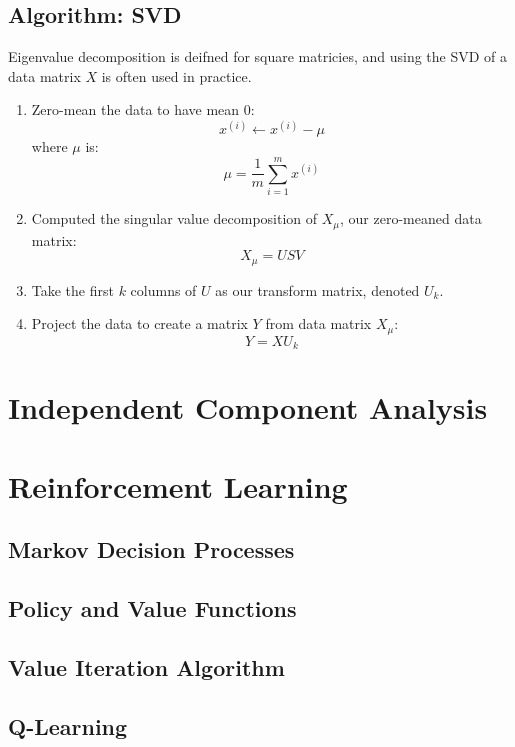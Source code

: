 \documentclass[twoside,twocolumn]{article}
\begin{document}
\subsection{Algorithm: SVD}
Eigenvalue decomposition is deifned for square matricies, and using the SVD of a
data matrix $X$ is often used in practice.
\begin{enumerate}
  \item Zero-mean the data to have mean $0$:
    \begin{equation} x^{(i)}\leftarrow x^{(i)}-\mu \end{equation}
      where $\mu$ is:
      \begin{equation} \mu = \frac{1}{m}\sum_{i=1}^mx^{(i)} \end{equation}
  \item Computed the singular value decomposition of $X_{\mu}$, our zero-meaned
    data matrix:
    \begin{equation}
      X_{\mu} = USV
    \end{equation}
  \item Take the first $k$ columns of $U$ as our transform matrix, denoted $U_k$.
  \item Project the data to create a matrix $Y$ from data matrix $X_{\mu}$:
    \begin{equation} Y = X U_k\end{equation}
\end{enumerate}
\section{Independent Component Analysis}
\section{Reinforcement Learning}
\subsection{Markov Decision Processes}
\subsection{Policy and Value Functions}
\subsection{Value Iteration Algorithm}
\subsection{Q-Learning}
\end{document}
